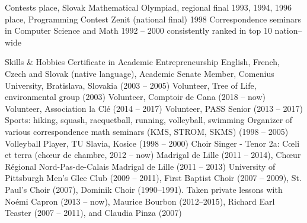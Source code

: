 \documentclass{resume}
\begin{document}

\begin{category}{Contests} 
\citembullet \first place, Slovak Mathematical Olympiad, regional final 1993, 1994, 1996
\citembullet \nineth place, Programming Contest Zenit (national final) 1998
\citembullet  Correspondence seminars in Computer Science and Math  1992 -- 2000
consistently ranked in top 10 nation--wide

\end{category}


\begin{category}{Skills \& Hobbies}
\citembullet Certificate in Academic Entrepreneurship
\citembullet English, French, Czech and Slovak (native language), 
\citembullet Academic Senate Member, Comenius University, Bratislava, Slovakia (2003 -- 2005)
\citembullet Volunteer, Tree of Life, environmental group (2003)
\citembullet Volunteer, Comptoir de Cana (2018 -- now)
\citembullet Volunteer, Association la Cl\' e (2014 -- 2017)
\citembullet Volunteer, PASS Senior (2013 -- 2017)
\citembullet Sports: hiking, squash, racquetball, running, volleyball, swimming
\citembullet Organizer of various correspondence math seminars (KMS, STROM, SKMS) (1998 -- 2005)
\citembullet Volleyball Player, TU Slavia, Kosice (1998 -- 2000)
\citembullet Choir Singer - Tenor 2a: C\oe{}li et terra (ch\oe{}ur de chambre, 2012 -- now)
Madrigal de Lille (2011 -- 2014), Ch\oe{}ur R\'egional Nord-Pas-de-Calais Madrigal de Lille (2011 -- 2013)
University of Pittsburgh Men's Glee Club (2009 -- 2011), First Baptist Choir (2007 -- 2009), St.\,Paul's Choir (2007), Dominik Choir (1990--1991). %
Taken private lessons with No\' emi Capron (2013 -- now), Maurice Bourbon (2012--2015),  Richard Earl Teaster (2007 -- 2011), and Claudia Pinza (2007)
\end{category}
\end{document}
